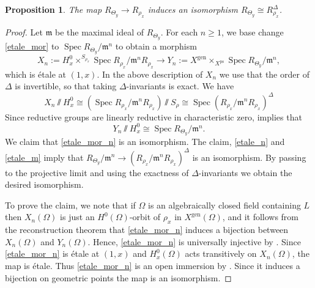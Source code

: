 \documentclass{amsart}
\newtheorem{prop}{Proposition}[section]
\theoremstyle{definition}
\theoremstyle{remark}
\DeclareMathOperator{\Spec}{Spec}
\newcommand{\mm}{\mathfrak m}
\newcommand{\gen}{\mathrm{gen}}
\newcommand{\ps}{\mathrm{ps}}
\begin{document}
\begin{prop}\label{main_luna} The map $R_{\Theta_y}\rightarrow R_{\rho_x}$ induces an isomorphism $R_{\Theta_y}\cong 
R_{\rho_x}^{\Delta}$.
\end{prop}


\begin{proof}
Let $\mm$ be the maximal ideal of $R_{\Theta_y}$. For each $n\ge 1$, we base change   \eqref{etale_mor} to $\Spec R_{\Theta_y}/\mm^n$ to obtain 
 a morphism
\begin{equation}\label{etale_mor_n}
X_n:= H^0_x\times^{S_{\rho_x}} \Spec R_{\rho_x}/\mm^n R_{\rho_x}\rightarrow Y_n:=X^{\gen} \times_{X^{\ps}}\Spec R_{\Theta_y}/\mm^n,
\end{equation} 
which is \'etale at $(1,x)$. In the above description of $X_n$ we use that the order of $\Delta$ is invertible, so that taking $\Delta$-invariants is exact. We have 
\begin{equation}\label{etale_n}
X_n\sslash H^0_x\cong (\Spec R_{\rho_x}/\mm^n R_{\rho_x})\sslash S_{\rho}\cong \Spec (R_{\rho_x}/\mm^n R_{\rho_x})^{\Delta}
\end{equation}
Since 
reductive groups are linearly reductive in characteristic zero,  implies that
\begin{equation}\label{etale_m}
Y_n \sslash H^0_x\cong \Spec R_{\Theta_y}/\mm^n.
\end{equation}
We claim that \eqref{etale_mor_n} is an isomorphism. 
The claim,  \eqref{etale_n}
and \eqref{etale_m} imply that 
$R_{\Theta_y}/\mm^n\rightarrow (R_{\rho_x}/\mm^n R_{\rho_x})^{\Delta}$ is an isomorphism. 
By passing to the projective 
limit and using the exactness of $\Delta$-invariants we obtain 
the desired isomorphism.

To prove the claim, we note that if $\Omega$ is an algebraically closed field containing $L$ then  $X_n(\Omega)$ is 
just an $H^0(\Omega)$-orbit of $\rho_x$ in $X^{\gen}(\Omega)$, and it follows 
from the reconstruction theorem \cite[Theorem 3.7]{quast} that 
\eqref{etale_mor_n} induces a bijection between 
$X_n(\Omega)$ and $Y_n(\Omega)$.  
Hence, \eqref{etale_mor_n} is universally injective by \cite[\href{https://stacks.math.columbia.edu/tag/01S4}{Tag 01S4}]{stacks-project}. Since 
\eqref{etale_mor_n} is \'etale at 
$(1,x)$ and $H^0_x(\Omega)$ acts transitively on $X_n(\Omega)$, the map is \'etale. Thus \eqref{etale_mor_n} 
is an open immersion by \cite[\href{https://stacks.math.columbia.edu/tag/025G}{Tag 025G}]{stacks-project}. Since it induces a bijection on geometric points the map is an isomorphism. 
\end{proof}
\end{document}
